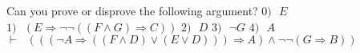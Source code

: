 \documentclass{article}
\begin{document}
Can you prove or disprove the following argument? \newline \newline
 $ 0) ~~~  E$ \newline\newline
 $ 1) ~~~  (E \Rightarrow  \lnot  \lnot ((F \land G) \Rightarrow C))$ \newline\newline
 $ 2) ~~~  D$ \newline\newline
 $ 3) ~~~   \lnot G$ \newline\newline
 $ 4) ~~~  A$ \newline\newline
 $ \vdash ~~~   ((( \lnot A \Rightarrow ((F \land D) \lor (E \lor D))) \Rightarrow A) \land  \lnot  \lnot (G \Rightarrow B))$ \newline\newline
\end{document}

